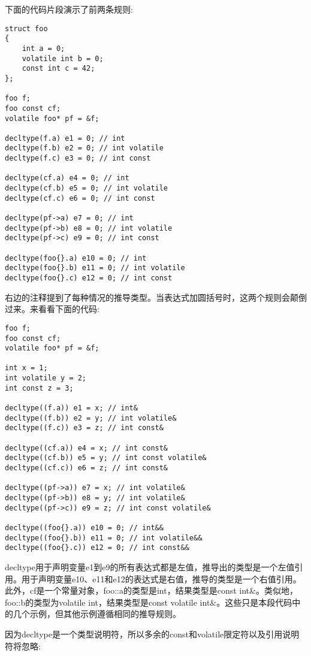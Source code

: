 下面的代码片段演示了前两条规则:

\begin{lstlisting}[style=styleCXX]
struct foo
{
	int a = 0;
	volatile int b = 0;
	const int c = 42;
};

foo f;
foo const cf;
volatile foo* pf = &f;

decltype(f.a) e1 = 0; // int
decltype(f.b) e2 = 0; // int volatile
decltype(f.c) e3 = 0; // int const

decltype(cf.a) e4 = 0; // int
decltype(cf.b) e5 = 0; // int volatile
decltype(cf.c) e6 = 0; // int const

decltype(pf->a) e7 = 0; // int
decltype(pf->b) e8 = 0; // int volatile
decltype(pf->c) e9 = 0; // int const

decltype(foo{}.a) e10 = 0; // int
decltype(foo{}.b) e11 = 0; // int volatile
decltype(foo{}.c) e12 = 0; // int const
\end{lstlisting}

右边的注释提到了每种情况的推导类型。当表达式加圆括号时，这两个规则会颠倒过来。来看看下面的代码:

\begin{lstlisting}[style=styleCXX]
foo f;
foo const cf;
volatile foo* pf = &f;

int x = 1;
int volatile y = 2;
int const z = 3;

decltype((f.a)) e1 = x; // int&
decltype((f.b)) e2 = y; // int volatile&
decltype((f.c)) e3 = z; // int const&

decltype((cf.a)) e4 = x; // int const&
decltype((cf.b)) e5 = y; // int const volatile&
decltype((cf.c)) e6 = z; // int const&

decltype((pf->a)) e7 = x; // int volatile&
decltype((pf->b)) e8 = y; // int volatile&
decltype((pf->c)) e9 = z; // int const volatile&

decltype((foo{}.a)) e10 = 0; // int&&
decltype((foo{}.b)) e11 = 0; // int volatile&&
decltype((foo{}.c)) e12 = 0; // int const&&
\end{lstlisting}

decltype用于声明变量e1到e9的所有表达式都是左值，推导出的类型是一个左值引用。用于声明变量e10、e11和e12的表达式是右值，推导的类型是一个右值引用。此外，cf是一个常量对象，foo::a的类型是int，结果类型是const int\&。类似地，foo::b的类型为volatile int，结果类型是const volatile int\&。这些只是本段代码中的几个示例，但其他示例遵循相同的推导规则。

因为decltype是一个类型说明符，所以多余的const和volatile限定符以及引用说明符将忽略:

